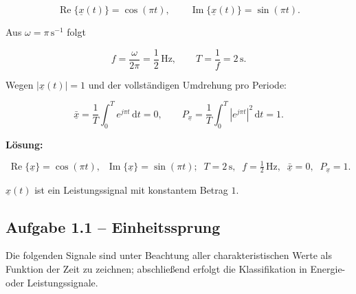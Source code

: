 \begin{beispiel}
$$
\operatorname{Re}\{\underline{x}(t)\} = \cos(\pi t), \qquad
\operatorname{Im}\{\underline{x}(t)\} = \sin(\pi t).
$$

Aus $\omega = \pi\,\mathrm{s}^{-1}$ folgt

$$
f = \frac{\omega}{2\pi} = \frac{1}{2}\,\mathrm{Hz}, \qquad
T = \frac{1}{f} = 2\,\mathrm{s}.
$$

Wegen $|\underline{x}(t)| = 1$ und der vollständigen Umdrehung pro Periode:

$$
\bar{\underline{x}} = \frac{1}{T}\int_0^T e^{j\pi t}\,\mathrm{d}t = 0,
\qquad
P_{\underline{x}} = \frac{1}{T}\int_0^T |e^{j\pi t}|^2\,\mathrm{d}t = 1.
$$

\begin{center}
\end{center}

\textbf{Lösung:}

$$
\boxed{\;\operatorname{Re}\{\underline{x}\} = \cos(\pi t),\;\;
\operatorname{Im}\{\underline{x}\} = \sin(\pi t);\;\;
T = 2\,\mathrm{s},\;\; f = \tfrac12\,\mathrm{Hz},\;\;
\bar{\underline{x}} = 0,\;\; P_{\underline{x}} = 1.\;}
$$

$\underline{x}(t)$ ist ein Leistungssignal mit konstantem Betrag $1$.

\end{beispiel}

\subsection*{Aufgabe 1.1 – Einheitssprung}

Die folgenden Signale sind unter Beachtung aller charakteristischen Werte als
Funktion der Zeit zu zeichnen; abschließend erfolgt die Klassifikation in
Energie- oder Leistungssignale.

